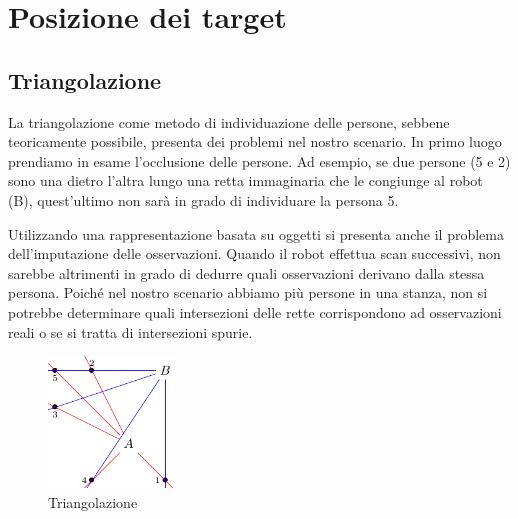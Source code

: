 \documentclass[a4paper]{article}
\begin{document}
	\newpage
	\section{Posizione dei target}\label{sec:Posizione-dei-target}
	\subsection{Triangolazione}\label{subsec:Triangolazione}
	La triangolazione come metodo di individuazione delle persone, sebbene
	teoricamente possibile, presenta dei problemi nel nostro scenario. In primo
	luogo prendiamo in esame l'occlusione delle persone. Ad esempio, se due
	persone (5 e 2) sono una dietro l'altra lungo una retta immaginaria che le
	congiunge al robot (B), quest'ultimo non sarà in grado di individuare la
	persona 5. 
	
	Utilizzando una rappresentazione basata su oggetti si presenta anche il
	problema dell'imputazione delle osservazioni. Quando il robot effettua scan
	successivi, non sarebbe altrimenti in grado di dedurre quali osservazioni
	derivano dalla stessa persona.  Poiché nel nostro scenario abbiamo più
	persone in una stanza, non si potrebbe determinare quali intersezioni delle
	rette corrispondono ad osservazioni reali o se si tratta di intersezioni
	spurie. 
	
	\begin{figure}[H]
		\centering
		\includegraphics[width=0.3\textwidth]{./img/ideal_object_triangulation.pdf}
		\caption{Triangolazione}
		\label{fig:triangulation}
	\end{figure}
	
\end{document}
